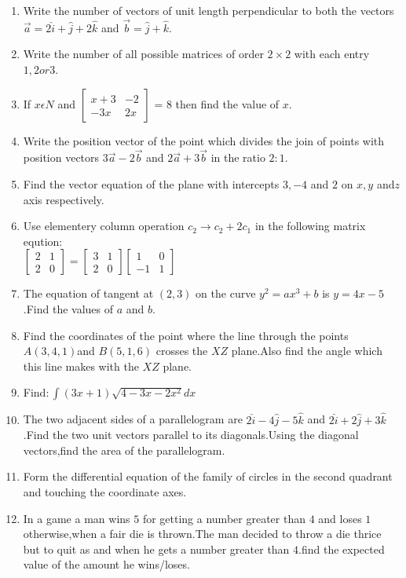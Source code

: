\documentclass[12pt,-letter paper]{article}
\providecommand{\myvec}[1]{\ensuremath{\begin{bmatrix}#1\end{bmatrix}}}
\providecommand{\brak}[1]{\ensuremath{\left(#1\right)}}
\begin{document}
\begin{enumerate}
	\item Write the number of vectors of unit length perpendicular to both the vectors $\overset{\rightarrow}{a} = 2\hat{i} + \hat{j} + 2\hat{k}$ and $\overset{\rightarrow}{b} = \hat{j} + \hat{k}$.
\item Write the number of all possible matrices of order $2\times2$ with each entry $1,2 or 3$.
\item If $x \epsilon  N$  and $\myvec{x+3 & -2 \\ -3x & 2x }$ = $8$   then   find  the  value  of $ x$.
\item Write the position vector of the point which divides the join of points with position vectors $ 3\overset{\rightarrow} {a} - 2\overset{\rightarrow} {b} $ and $ 2\overset{\rightarrow}{a} + 3\overset{\rightarrow}{b} $ in the ratio $ 2:1 $.	
\item Find the vector equation of the plane with intercepts $3,-4$ and $2$ on $x,y$ and$z$ axis respectively.
\item Use elementery column operation $c_{2} \rightarrow c_{2}+2c_{1}$ in the following matrix eqution:\\ $\myvec{2 & 1 \\ 2 & 0}=\myvec{3 & 1 \\ 2 & 0}\myvec{1 & 0 \\ -1 & 1}$
\item The equation of tangent at $\brak{2,3}$ on the curve $y^2=ax^3+b$ is $y=4x-5$.Find the values of $a$ and $b$.
\item Find the coordinates of the point where the line through the points $ A\brak{3,4,1} $and $B\brak{5,1,6}$ crosses the $XZ$ plane.Also find the angle  which this line makes with the $XZ$ plane.
\item Find$:\int\brak{3x+1}\sqrt {4-3x-2x^2}dx$
\item The two adjacent sides of a parallelogram are  $ 2\hat{i}-4\hat{j}-5\hat{k} $ and $2\hat{i}+2\hat{j}+3\hat{k} $.Find the two unit vectors parallel to its diagonals.Using the diagonal vectors,find the area of the parallelogram.	
\item Form the differential equation of the family of circles in the second quadrant and touching the coordinate axes.
\item In a game a man wins  \rupee$5$  for getting a number greater than $4$ and loses  \rupee $1$  otherwise,when a fair die is thrown.The man decided to throw a die thrice but to quit as and when he gets a number greater than $4$.find the expected value of the amount he wins/loses.

\end{enumerate}
\end{document}
